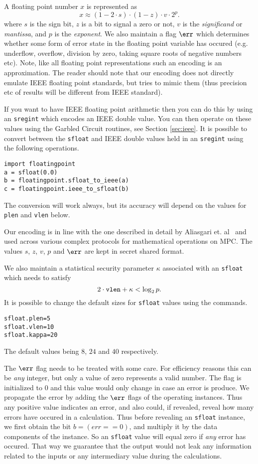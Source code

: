 \noindent
A floating point number $x$ is represented as
\[
  x\approx (1-2 \cdot s)\cdot (1-z)\cdot v\cdot 2^{p}.
\]
where $s$ is the sign bit,
$z$ is a bit to signal a zero or not,
$v$ is the \textit{significand} or \textit{mantissa},
and $p$ is the \textit{exponent}.
We also maintain a flag $\err$ which determines whether
some form of error state in the floating point variable
has occured (e.g. underflow, overflow, division by zero, taking
square roots of negative numbers etc).
Note, like all floating point representations such an encoding is
an approximation.
The reader should note that our encoding does not directly
emulate IEEE floating point standards, but tries to mimic them
(thus precision etc of results will be different from IEEE
standard).

If you want to have IEEE floating point arithmetic then you
can do this by using an \verb|sregint| which encodes an
IEEE double value.
You can then operate on these values using the Garbled Circuit
routines, see Section \ref{sec:ieee}.
It is possible to convert between the \verb|sfloat| and
IEEE double values held in an \verb|sregint| using the following
operations.
\begin{lstlisting}
import floatingpoint
a = sfloat(0.0)
b = floatingpoint.sfloat_to_ieee(a)
c = floatingpoint.ieee_to_sfloat(b)
\end{lstlisting}
The conversion will work always, but its accuracy will
depend on the values for \verb|plen| and \verb|vlen|
below.

Our encoding is in line with the one described in detail
by Aliasgari et. al~\cite{ABZS13} and used across various
complex protocols for mathematical operations on MPC.
The values $s$, $z$, $v$, $p$ and $\err$ are kept in
secret shared format.

We also maintain a statistical security parameter $\kappa$
associated with an \verb+sfloat+ which needs
to satisfy
\[ 2 \cdot \verb+vlen+  + \kappa < \log_2 p. \]
It is possible to change the default sizes for \verb|sfloat| values using the commands.
\begin{lstlisting}
sfloat.plen=5
sfloat.vlen=10
sfloat.kappa=20
\end{lstlisting}
The default values being $8$, $24$ and $40$ respectively.

The $\err$ flag needs to be treated with some care.
For efficiency reasons this can be {\em any} integer, but only
a value of zero represents a valid number.
The flag is initialized to $0$ and this value would only change in case an error is produce.
We propagate the error by adding the $\err$ flags of the operating instances.
Thus any positive value indicates an error, and also could, if revealed, reveal how
many errors have occured in a calculation.
Thus before revealing an \verb|sfloat| instance, we first obtain the bit $ b = (err == 0)$,
and multiply it by the data components of the instance. So an \verb|sfloat| value
will equal zero if {\em any} error has occured.
That way we guarantee that the output would not leak any information
related to the inputs or any intermediary value during the calculations.

